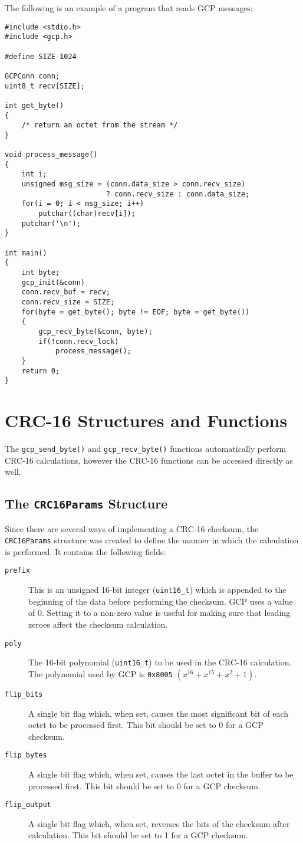 \documentclass{article}
\begin{document}
The following is an example of a program that reads GCP messages:
\begin{verbatim}
#include <stdio.h>
#include <gcp.h>

#define SIZE 1024

GCPConn conn;
uint8_t recv[SIZE];

int get_byte()
{
    /* return an octet from the stream */
}

void process_message()
{
    int i;
    unsigned msg_size = (conn.data_size > conn.recv_size)
                        ? conn.recv_size : conn.data_size;
    for(i = 0; i < msg_size; i++)
        putchar((char)recv[i]);
    putchar('\n');    
}

int main()
{
    int byte;
    gcp_init(&conn)
    conn.recv_buf = recv;
    conn.recv_size = SIZE;
    for(byte = get_byte(); byte != EOF; byte = get_byte())
    {
        gcp_recv_byte(&conn, byte);
        if(!conn.recv_lock)
            process_message();
    }
    return 0;
}
\end{verbatim}

\section{CRC-16 Structures and Functions}
The \texttt{gcp\_send\_byte()} and \texttt{gcp\_recv\_byte()}
functions automatically perform CRC-16 calculations, however the
CRC-16 functions can be accessed directly as well.

\subsection{The \texttt{CRC16Params} Structure}
\label{sec:crc-params}
Since there are several ways of implementing a CRC-16 checksum, the
\texttt{CRC16Params} structure was created to define the manner in
which the calculation is performed.  It contains the following fields:
\begin{description}
\item[\texttt{prefix}]This is an unsigned 16-bit integer
  (\texttt{uint16\_t}) which is appended to the beginning of the data
  before performing the checksum.  GCP uses a value of 0.  Setting it
  to a non-zero value is useful for making sure that leading zeroes
  affect the checksum calculation.
\item[\texttt{poly}]The 16-bit polynomial (\texttt{uint16\_t}) to be
  used in the CRC-16 calculation.  The polynomial used by GCP is
  \texttt{0x8005} $(x^{16} + x^{15} + x^2 + 1)$.
\item[\texttt{flip\_bits}]A single bit flag which, when set, causes
  the most significant bit of each octet to be processed first.  This
  bit should be set to 0 for a GCP checksum.
\item[\texttt{flip\_bytes}]A single bit flag which, when set, causes
  the last octet in the buffer to be processed first.  This bit should
  be set to 0 for a GCP checksum.
\item[\texttt{flip\_output}]A single bit flag which, when set,
  reverses the bits of the checksum after calculation.  This bit
  should be set to 1 for a GCP checksum.
\end{description}
\end{document}
